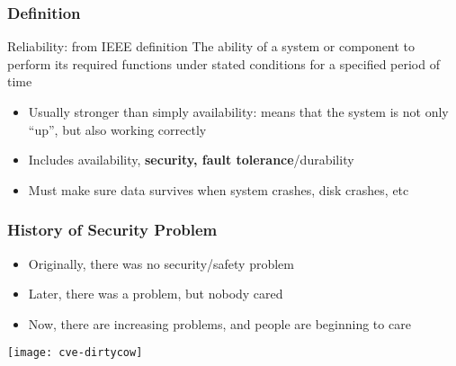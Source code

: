 \begin{frame}[plain]	
	\frametitle{Definition}
	\Large
	\begin{block}{Reliability: from IEEE definition}
		The ability of a system or component to perform its required functions under stated conditions for a specified period of time
	\end{block} \pause

	\begin{itemize}\large
		\item Usually stronger than simply availability: means that the system is not only “up”, but also working correctly
		\item Includes availability, \textbf{security, fault tolerance}/durability
		\item Must make sure data survives when system crashes, disk crashes, etc
		
	\end{itemize}	

%

\end{frame}
\begin{frame}[plain]	
	\frametitle{History of Security Problem}
	
\begin{itemize}\Large
	\item Originally, there was no security/safety problem
	\item Later, there was a problem, but nobody cared
	\item Now, there are increasing problems, and people are
	beginning to care
	
	
\end{itemize}	

\centering
\texttt{[image: cve-dirtycow]}
	
\end{frame}

